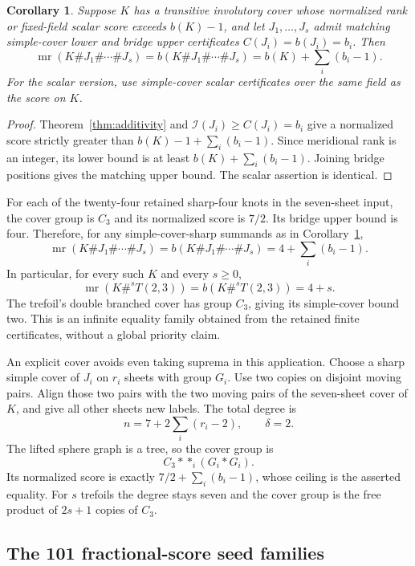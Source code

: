 \documentclass[11pt]{article}
\newtheorem{corollary}[theorem]{Corollary}
\newcommand{\mr}{\operatorname{mr}}
\newcommand{\I}{\mathcal I}
\begin{document}
\begin{corollary}\label{cor:onefraction}
Suppose $K$ has a transitive involutory cover whose normalized rank or
fixed-field scalar score exceeds $b(K)-1$, and let
$J_1,\ldots,J_s$ admit matching simple-cover lower and bridge upper
certificates $C(J_i)=b(J_i)=b_i$.
Then
\[
 \mr(K\#J_1\#\cdots\#J_s)
   =b(K\#J_1\#\cdots\#J_s)
   =b(K)+\sum_i(b_i-1).
\]
For the scalar version, use simple-cover scalar certificates over the
same field as the score on $K$.
\end{corollary}
\begin{proof}
Theorem~\ref{thm:additivity} and $\I(J_i)\ge C(J_i)=b_i$ give a
normalized score strictly greater than
$b(K)-1+\sum_i(b_i-1)$. Since meridional rank is an integer, its lower
bound is at least $b(K)+\sum_i(b_i-1)$. Joining bridge positions gives
the matching upper bound. The scalar assertion is identical.
\end{proof}

For each of the twenty-four retained sharp-four knots in the
seven-sheet input, the cover group is $C_3$ and its normalized
score is $7/2$. Its bridge upper bound is four. Therefore, for any
simple-cover-sharp summands as in Corollary~\ref{cor:onefraction},
\[
              \mr(K\#J_1\#\cdots\#J_s)
               =b(K\#J_1\#\cdots\#J_s)
               =4+\sum_i(b_i-1).
\]
In particular, for every such $K$ and every $s\ge0$,
\[
                      \mr(K\#^{s}T(2,3))
                       =b(K\#^{s}T(2,3))=4+s.
\]
The trefoil's double branched cover has group $C_3$, giving its
simple-cover bound two. This is an infinite equality family obtained
from the retained finite certificates, without a global priority claim.

An explicit cover avoids even taking suprema in this application.
Choose a sharp simple cover of $J_i$ on $r_i$ sheets with group $G_i$.
Use two copies on disjoint moving pairs. Align those two pairs with
the two moving pairs of the seven-sheet cover of $K$, and give all
other sheets new labels. The total degree is
\[
                         n=7+2\sum_i(r_i-2),\qquad\delta=2.
\]
The lifted sphere graph is a tree, so the cover group is
\[
               C_3*\mathop{*}_i(G_i*G_i).
\]
Its normalized score is exactly
$7/2+\sum_i(b_i-1)$, whose ceiling is the asserted equality.
For $s$ trefoils the degree stays seven and the cover group is the
free product of $2s+1$ copies of $C_3$.


\subsection{The 101 fractional-score seed families}
\end{document}
